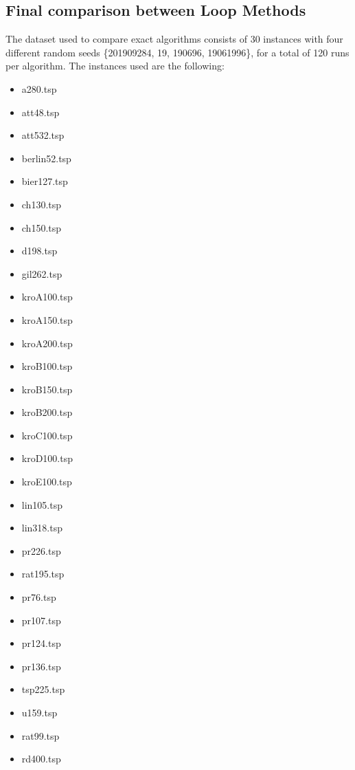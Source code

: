 \subsection{Final comparison between Loop Methods}
The dataset used to compare exact algorithms consists of 30 instances with four different random seeds \{201909284, 19, 190696, 19061996\}, for a total of 120 runs per algorithm. The instances used are the following:
 \begin{multicols}{3}
    \begin{itemize}
        \item a280.tsp
        \item att48.tsp
        \item att532.tsp
        \item berlin52.tsp
        \item bier127.tsp
        \item ch130.tsp
        \item ch150.tsp
        \item d198.tsp
        \item gil262.tsp
        \item kroA100.tsp
        \item kroA150.tsp
        \item kroA200.tsp
        \item kroB100.tsp 
        \item kroB150.tsp
        \item kroB200.tsp
        \item kroC100.tsp
        \item kroD100.tsp
        \item kroE100.tsp 
        \item lin105.tsp
        \item lin318.tsp 
        \item pr226.tsp 
        \item rat195.tsp 
        \item pr76.tsp 
        \item pr107.tsp 
        \item pr124.tsp
        \item pr136.tsp
        \item tsp225.tsp
        \item u159.tsp
        \item rat99.tsp
        \item rd400.tsp
    \end{itemize}
    \end{multicols}
